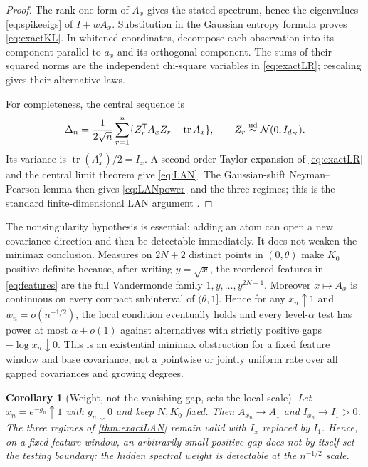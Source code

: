 \documentclass[11pt]{article}
\newtheorem{corollary}[theorem]{Corollary}
\theoremstyle{definition}
\theoremstyle{remark}
\newcommand{\tr}{\operatorname{tr}}
\begin{document}
\begin{proof}
The rank-one form of $A_x$ gives the stated spectrum, hence the eigenvalues
\eqref{eq:spikeeigs} of $I+wA_x$.  Substitution in the Gaussian entropy
formula proves \eqref{eq:exactKL}.  In whitened coordinates, decompose each
observation into its component parallel to $a_x$ and its orthogonal component.
The sums of their squared norms are the independent chi-square variables in
\eqref{eq:exactLR}; rescaling gives their alternative laws.

For completeness, the central sequence is
\[
 \Delta_n=\frac1{2\sqrt n}\sum_{r=1}^n
 \{Z_r^{\mathsf T}A_xZ_r-\tr A_x\},
 \qquad Z_r\stackrel{\rm iid}{\sim}\mathcal N(0,I_{d_N}).
\]
Its variance is $\tr(A_x^2)/2=I_x$.  A second-order Taylor expansion of
\eqref{eq:exactLR} and the central limit theorem give \eqref{eq:LAN}.
The Gaussian-shift Neyman--Pearson lemma then gives \eqref{eq:LANpower} and
the three regimes; this is the standard finite-dimensional LAN argument
\cite{vanDerVaart1998}.
\end{proof}

The nonsingularity hypothesis is essential: adding an atom can open a new
covariance direction and then be detectable immediately.  It does not weaken
the minimax conclusion.  Measures on $2N+2$ distinct points in $(0,\theta)$
make $K_0$ positive definite because, after writing $y=\sqrt x$, the reordered
features in \eqref{eq:features} are the full Vandermonde family
$1,y,\ldots,y^{2N+1}$.  Moreover $x\mapsto A_x$ is continuous on every compact
subinterval of $(\theta,1]$.  Hence for any $x_n\uparrow1$ and
$w_n=o(n^{-1/2})$, the local condition eventually holds and every
level-$\alpha$ test has power at most $\alpha+o(1)$ against alternatives with
strictly positive gaps $-\log x_n\downarrow0$.  This is an existential minimax
obstruction for a fixed feature window and base covariance, not a pointwise or
jointly uniform rate over all gapped covariances and growing degrees.

\begin{corollary}[Weight, not the vanishing gap, sets the local scale]
\label{cor:gapweightphase}
Let $x_n=e^{-g_n}\uparrow1$ with $g_n\downarrow0$ and keep $N,K_0$ fixed.
Then $A_{x_n}\to A_1$ and $I_{x_n}\to I_1>0$.  The three regimes of
\cref{thm:exactLAN} remain valid with $I_x$ replaced by $I_1$.  Hence, on a
fixed feature window, an arbitrarily small positive gap does not by itself set
the testing boundary: the hidden spectral weight is detectable at the
$n^{-1/2}$ scale.
\end{corollary}
\end{document}
